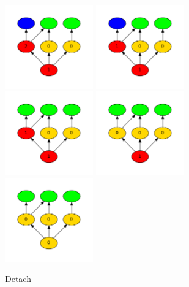 \documentclass[12pt]{article}
\begin{document}
\begin{figure}
\includegraphics[width=1.5in]{tutorial_1/dot7.pdf}
\includegraphics[width=1.5in]{tutorial_1/dot8.pdf}
\includegraphics[width=1.5in]{tutorial_1/dot9.pdf}
\includegraphics[width=1.5in]{tutorial_1/dot10.pdf}
\includegraphics[width=1.5in]{tutorial_1/dot11.pdf}
\caption{Detach}
\label{fig:detach}
\end{figure}
\end{document}
